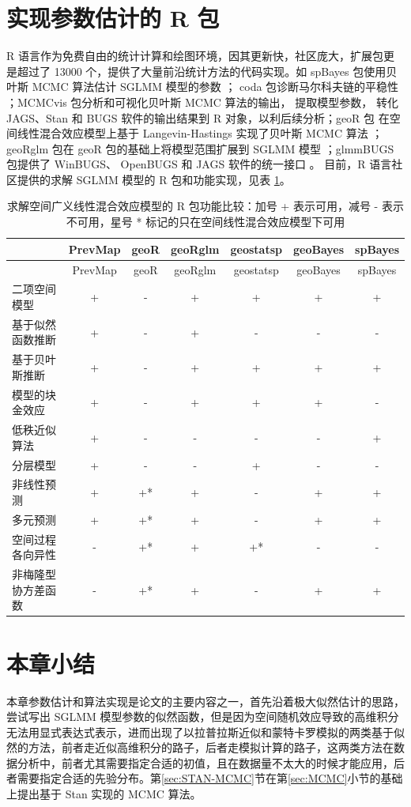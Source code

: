\documentclass[12pt,a4paper,UTF8,twoside]{book}
\theoremstyle{definition}
\theoremstyle{definition}
\theoremstyle{definition}
\theoremstyle{remark}
\begin{document}
\hypertarget{subsec:sglmm-with-r}{%
\section{实现参数估计的 R 包}\label{subsec:sglmm-with-r}}

R
语言作为免费自由的统计计算和绘图环境，因其更新快，社区庞大，扩展包更是超过了
13000 个，提供了大量前沿统计方法的代码实现。如 spBayes 包使用贝叶斯 MCMC
算法估计 SGLMM 模型的参数 \citep{spBayes2015}； coda
包诊断马尔科夫链的平稳性 \citep{coda2006}；MCMCvis 包分析和可视化贝叶斯
MCMC 算法的输出， 提取模型参数， 转化 JAGS、Stan 和 BUGS
软件的输出结果到 R 对象，以利后续分析；geoR 包
在空间线性混合效应模型上基于 Langevin-Hastings 实现了贝叶斯 MCMC 算法
\citep{geoR2001}；geoRglm 包在 geoR 包的基础上将模型范围扩展到 SGLMM
模型 \citep{geoRglm2002}；glmmBUGS 包提供了 WinBUGS、 OpenBUGS 和 JAGS
软件的统一接口 \citep{glmmBUGS2010MCMC}。 目前，R 语言社区提供的求解
SGLMM 模型的 R 包和功能实现，见表 \ref{tab:sglmm-packages}。

\begin{longtable}[]{@{}lcccccc@{}}
\caption{\label{tab:sglmm-packages} 求解空间广义线性混合效应模型的 R
包功能比较：加号 + 表示可用，减号 - 表示不可用，星号 *
标记的只在空间线性混合效应模型下可用}\tabularnewline
\toprule
& PrevMap & geoR & geoRglm & geostatsp & geoBayes &
spBayes\tabularnewline
\midrule
\endfirsthead
\toprule
& PrevMap & geoR & geoRglm & geostatsp & geoBayes &
spBayes\tabularnewline
\midrule
\endhead
二项空间模型 & + & - & + & + & + & +\tabularnewline
基于似然函数推断 & + & - & + & - & - & -\tabularnewline
基于贝叶斯推断 & + & - & + & + & + & +\tabularnewline
模型的块金效应 & + & - & + & + & + & -\tabularnewline
低秩近似算法 & + & - & - & - & - & +\tabularnewline
分层模型 & + & - & - & + & - & -\tabularnewline
非线性预测 & + & +* & + & - & + & +\tabularnewline
多元预测 & + & +* & + & - & + & +\tabularnewline
空间过程各向异性 & - & +* & + & +* & - & -\tabularnewline
非梅隆型协方差函数 & - & +* & + & - & + & +\tabularnewline
\bottomrule
\end{longtable}

\hypertarget{sec:estimations}{%
\section{本章小结}\label{sec:estimations}}

本章参数估计和算法实现是论文的主要内容之一，首先沿着极大似然估计的思路，尝试写出
SGLMM
模型参数的似然函数，但是因为空间随机效应导致的高维积分无法用显式表达式表示，进而出现了以拉普拉斯近似和蒙特卡罗模拟的两类基于似然的方法，前者走近似高维积分的路子，后者走模拟计算的路子，这两类方法在数据分析中，前者尤其需要指定合适的初值，且在数据量不太大的时候才能应用，后者需要指定合适的先验分布。第\ref{sec:STAN-MCMC}节在第\ref{sec:MCMC}小节的基础上提出基于
Stan 实现的 MCMC 算法。
\end{document}
